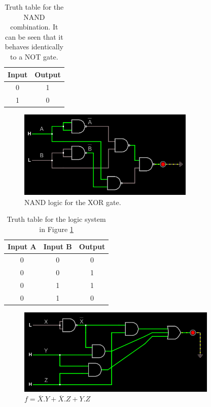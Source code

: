\documentclass{article}
\newcommand{\ol}[1]{\overline{#1}}
\begin{document}
	 	\begin{table}[H]
	 	\centering
	 	\begin{tabular}{|c|c|}
	 		\hline
	 		Input & Output \\
	 		\hline 
	 		0 & 1\\
	 		1 & 0\\
	 		\hline
	 	\end{tabular}
	 	\caption{Truth table for the NAND combination. It can be seen that it behaves identically to a NOT gate.}
	 \end{table}
 
	


	\begin{figure}[H]
		\centering
		\includegraphics[width=0.75\textwidth]{XOR}
		\caption{NAND logic for the XOR gate.}
		\label{circuit2}
	\end{figure}

 
\begin{table}[H]
	\centering
	\begin{tabular}{|c|c|c|}
		\hline
		Input A & Input B & Output\\
		\hline
		0 & 0 & 0\\
		0 & 0 & 1\\
		0 & 1 & 1\\
		0 & 1 & 0\\
		\hline
	\end{tabular}
	\caption{Truth table for the logic system in Figure \ref{circuit2}}

\end{table}

	\begin{figure}[H]
		\centering
		\includegraphics[width=0.85\textwidth]{extra}
		\caption{$f= \ol{X}.Y + \ol{X}.Z + Y.Z$}
		\label{}
	\end{figure}
\end{document}
